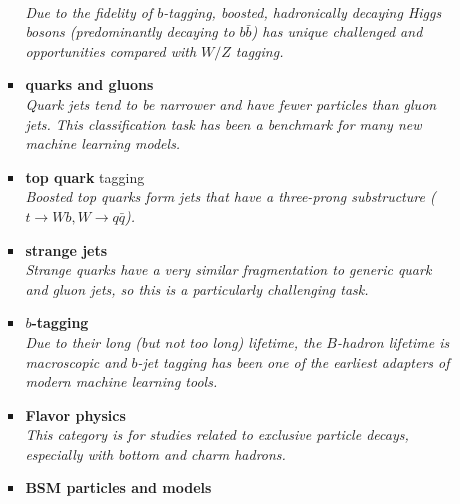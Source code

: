 \documentclass[12pt,letterpaper]{article}
\begin{document}
\begin{itemize}
\begin{itemize}
\begin{itemize}
			\\\textit{Due to the fidelity of $b$-tagging, boosted, hadronically decaying Higgs bosons (predominantly decaying to $b\bar{b}$) has unique challenged and opportunities compared with $W/Z$ tagging.}
			\item \textbf{quarks and gluons}~\cite{ATL-PHYS-PUB-2017-017,Komiske:2016rsd,Cheng:2017rdo,Stoye:DLPS2017,Chien:2018dfn,Moreno:2019bmu,Kasieczka:2018lwf,1806025,Lee:2019ssx,Lee:2019cad,Dreyer:2020brq,Romero:2021qlf,Filipek:2021qbe,Dreyer:2021hhr,Bright-Thonney:2022xkx}
			\\\textit{Quark jets tend to be narrower and have fewer particles than gluon jets.  This classification task has been a benchmark for many new machine learning models.}
			\item \textbf{top quark} tagging~\cite{Almeida:2015jua,Stoye:DLPS2017,Kasieczka:2019dbj,Chakraborty:2020yfc,Diefenbacher:2019ezd,Butter:2017cot,Kasieczka:2017nvn,Macaluso:2018tck,Bhattacharya:2020vzu,Lim:2020igi,Dreyer:2020brq,Aguilar-Saavedra:2021rjk,Andrews:2021ejw,Dreyer:2022yom,Ahmed:2022hct,Munoz:2022gjq}
			\\\textit{Boosted top quarks form jets that have a three-prong substructure ($t\rightarrow Wb,W\rightarrow q\bar{q}$).}
			\item \textbf{strange jets}~\cite{Nakai:2020kuu,Erdmann:2019blf,Erdmann:2020ovh}
			\\\textit{Strange quarks have a very similar fragmentation to generic quark and gluon jets, so this is a particularly challenging task.}
			\item \textbf{$b$-tagging}~\cite{Sirunyan:2017ezt,Guest:2016iqz,bielkov2020identifying,Bols:2020bkb,ATL-PHYS-PUB-2017-003,ATL-PHYS-PUB-2020-014,Liao:2022ufk}
			\\\textit{Due to their long (but not too long) lifetime, the $B$-hadron lifetime is macroscopic and $b$-jet tagging has been one of the earliest adapters of modern machine learning tools.}
			\item \textbf{Flavor physics}~\cite{1811097,Bahtiyar:2022une}
			\\\textit{This category is for studies related to exclusive particle decays, especially with bottom and charm hadrons.}
			\item \textbf{BSM particles and models}~\cite{Datta:2019ndh,Baldi:2014kfa,Chakraborty:2019imr,10.1088/2632-2153/ab9023,1792136,1801423,Chang:2020rtc,Cogollo:2020afo,Grossi:2020orx,Ngairangbam:2020ksz,Englert:2020ntw,Freitas:2020ttd,Khosa:2019kxd,Freitas:2019hbk,Stakia:2021pvp,Arganda:2021azw,Jorge:2021vpo,Ren:2021prq,Barron:2021btf,Yang:2021gge,Alvestad:2021sje,Morais:2021ead,Jung:2021tym,Drees:2021oew,Cornell:2021gut,Vidal:2021oed,Beauchesne:2021qrw,Feng:2021eke,Konar:2022bgc,Badea:2022dzb,Freitas:2022cno,Goodsell:2022beo,Lv:2022pme,Ai:2022qvs,Yang:2022fhw,Alasfar:2022vqw,Barbosa:2022mmw,Chiang:2022lsn,Hall:2022bme,Faucett:2022zie}

\end{itemize}
\end{itemize}
\end{itemize}
\end{document}
